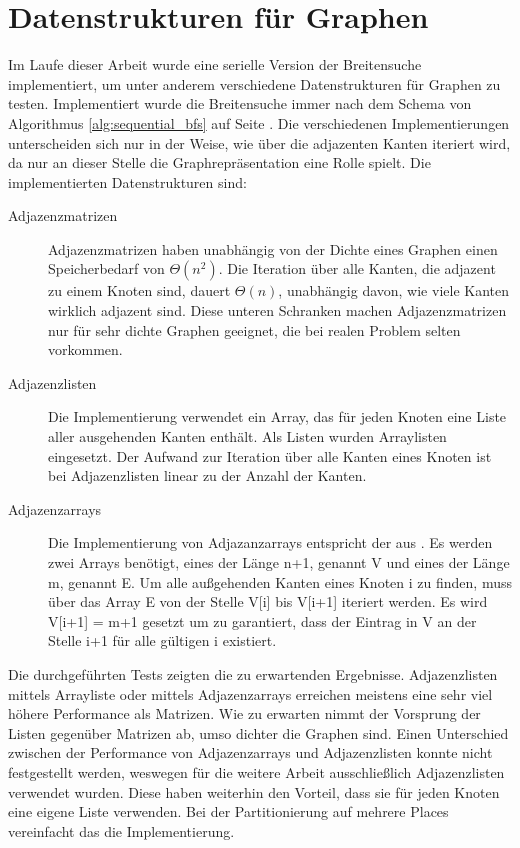 \section{Datenstrukturen für Graphen} %
\label{sec:datenstrukturen_f_r_graphen}
Im Laufe dieser Arbeit wurde eine serielle Version der Breitensuche implementiert, um unter anderem verschiedene Datenstrukturen für Graphen zu testen. Implementiert wurde die Breitensuche immer nach dem Schema von Algorithmus \ref{alg:sequential_bfs} auf Seite \pageref{alg:sequential_bfs}. Die verschiedenen Implementierungen unterscheiden sich nur in der Weise, wie über die adjazenten Kanten iteriert wird, da nur an dieser Stelle die Graphrepräsentation eine Rolle spielt. Die implementierten Datenstrukturen sind:
\begin{description}
	\item [Adjazenzmatrizen] Adjazenzmatrizen haben unabhängig von der Dichte eines Graphen einen Speicherbedarf von $\Theta(n^2)$. Die Iteration über alle Kanten, die adjazent zu einem Knoten sind, dauert $\Theta(n)$, unabhängig davon, wie viele Kanten wirklich adjazent sind. Diese unteren Schranken machen Adjazenzmatrizen nur für sehr dichte Graphen geeignet, die bei realen Problem selten vorkommen.
	\item [Adjazenzlisten] Die Implementierung verwendet ein Array, das für jeden Knoten eine Liste aller ausgehenden Kanten enthält. Als Listen wurden Arraylisten eingesetzt. Der Aufwand zur Iteration über alle Kanten eines Knoten ist bei Adjazenzlisten linear zu der Anzahl der Kanten.
	\item [Adjazenzarrays] Die Implementierung von Adjazanzarrays entspricht der aus \cite{SWB-283374373}. Es werden zwei Arrays benötigt, eines der Länge n+1, genannt V und eines der Länge m, genannt E. Um alle außgehenden Kanten eines Knoten i zu finden, muss über das Array E von der Stelle V[i] bis V[i+1] iteriert werden. Es wird V[i+1] = m+1 gesetzt um zu garantiert, dass der Eintrag in V an der Stelle i+1 für alle gültigen i existiert.
\end{description}

Die durchgeführten Tests zeigten die zu erwartenden Ergebnisse. Adjazenzlisten mittels Arrayliste oder mittels Adjazenzarrays erreichen meistens eine sehr viel höhere Performance als Matrizen. Wie zu erwarten nimmt der Vorsprung der Listen gegenüber Matrizen ab, umso dichter die Graphen sind. Einen Unterschied zwischen der Performance von Adjazenzarrays und Adjazenzlisten konnte nicht festgestellt werden, weswegen für die weitere Arbeit ausschließlich Adjazenzlisten verwendet wurden. Diese haben weiterhin den Vorteil, dass sie für jeden Knoten eine eigene Liste verwenden. Bei der Partitionierung auf mehrere Places vereinfacht das die Implementierung.

